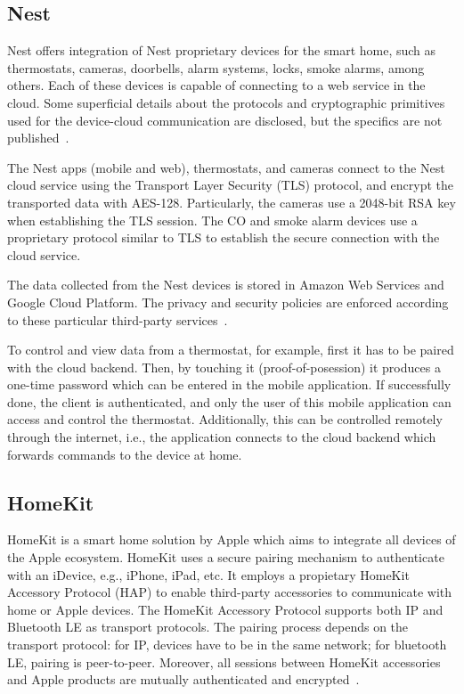 \documentclass[12pt]{article}
\begin{document}
\subsection{Nest}
Nest offers integration of Nest proprietary devices for the smart home, such as thermostats, cameras, doorbells, alarm systems, locks, smoke alarms, among others. Each of these devices is capable of connecting to a web service in the cloud. Some superficial details about the protocols and cryptographic primitives used for the device-cloud communication are disclosed, but the specifics are not published~\cite{related_01}.

The Nest apps (mobile and web), thermostats, and cameras connect to the Nest cloud service using the Transport Layer Security (TLS) protocol, and encrypt the transported data with AES-128. Particularly, the cameras use a 2048-bit RSA key when establishing the TLS session. The CO and smoke alarm devices use a proprietary protocol similar to TLS to establish the secure connection with the cloud service.

The data collected from the Nest devices is stored in Amazon Web Services and Google Cloud Platform. The privacy and security policies are enforced according to these particular third-party services~\cite{related_01}.

To control and view data from a thermostat, for example, first it has to be paired with the cloud backend. Then, by touching it (proof-of-posession) it produces a one-time password which can be entered in the mobile application. If successfully done, the client is authenticated, and only the user of this mobile application can access and control the thermostat. Additionally, this can be controlled remotely through the internet, i.e., the application connects to the cloud backend which forwards commands to the device at home.

\subsection{HomeKit}

HomeKit is a smart home solution by Apple which aims to integrate all devices of the Apple ecosystem. HomeKit uses a secure pairing mechanism to authenticate with an iDevice, e.g., iPhone, iPad, etc. It employs a propietary HomeKit Accessory Protocol (HAP) to enable third-party accessories to communicate with home or Apple devices. The HomeKit Accessory Protocol supports both IP and Bluetooth LE as transport protocols. The pairing process depends on the transport protocol: for IP, devices have to be in the same network; for bluetooth LE, pairing is peer-to-peer. Moreover, all sessions between HomeKit accessories and Apple products are mutually authenticated and encrypted~\cite{related_02}.
\end{document}
